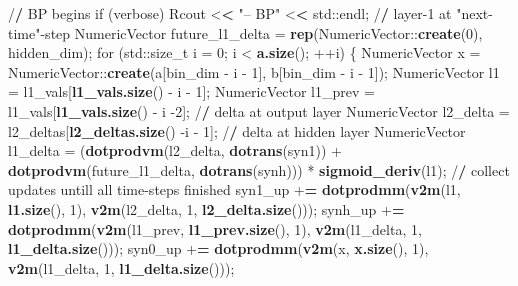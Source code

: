 \documentclass[]{article}
\newenvironment{Shaded}{\begin{snugshade}}{\end{snugshade}}
\newcommand{\KeywordTok}[1]{\textcolor[rgb]{0.13,0.29,0.53}{\textbf{{#1}}}}
\newcommand{\DataTypeTok}[1]{\textcolor[rgb]{0.13,0.29,0.53}{{#1}}}
\newcommand{\DecValTok}[1]{\textcolor[rgb]{0.00,0.00,0.81}{{#1}}}
\newcommand{\StringTok}[1]{\textcolor[rgb]{0.31,0.60,0.02}{{#1}}}
\newcommand{\ErrorTok}[1]{\textcolor[rgb]{0.64,0.00,0.00}{\textbf{{#1}}}}
\newcommand{\NormalTok}[1]{{#1}}
\begin{document}
\begin{Shaded}
\begin{Highlighting}[]
{{    \NormalTok{/}\ErrorTok{/}\StringTok{ }\NormalTok{BP begins}
    \NormalTok{if (verbose) Rcout <}\ErrorTok{<}\StringTok{ "-- BP"} \NormalTok{<}\ErrorTok{<}\StringTok{ }\NormalTok{std::endl;}
    \NormalTok{/}\ErrorTok{/}\StringTok{ }\NormalTok{layer}\DecValTok{-1} \NormalTok{at }\StringTok{"next-time"}\NormalTok{-step}
    \NormalTok{NumericVector future_l1_delta =}\StringTok{ }\KeywordTok{rep}\NormalTok{(NumericVector::}\KeywordTok{create}\NormalTok{(}\DecValTok{0}\NormalTok{), hidden_dim);}
    \NormalTok{for (std::size_t }\DataTypeTok{i =} \DecValTok{0}\NormalTok{; i <}\StringTok{ }\KeywordTok{a.size}\NormalTok{(); ++i) \{}
      \NormalTok{NumericVector x =}\StringTok{ }\NormalTok{NumericVector::}\KeywordTok{create}\NormalTok{(a[bin_dim -}\StringTok{ }\NormalTok{i -}\StringTok{ }\DecValTok{1}\NormalTok{],}
                                              \NormalTok{b[bin_dim -}\StringTok{ }\NormalTok{i -}\StringTok{ }\DecValTok{1}\NormalTok{]);}
      \NormalTok{NumericVector l1 =}\StringTok{ }\NormalTok{l1_vals[}\KeywordTok{l1_vals.size}\NormalTok{() -}\StringTok{ }\NormalTok{i -}\StringTok{ }\DecValTok{1}\NormalTok{];}
      \NormalTok{NumericVector l1_prev =}\StringTok{ }\NormalTok{l1_vals[}\KeywordTok{l1_vals.size}\NormalTok{() -}\StringTok{ }\NormalTok{i -}\DecValTok{2}\NormalTok{];}
      \NormalTok{/}\ErrorTok{/}\StringTok{ }\NormalTok{delta at output layer}
      \NormalTok{NumericVector l2_delta =}\StringTok{ }\NormalTok{l2_deltas[}\KeywordTok{l2_deltas.size}\NormalTok{() -i -}\StringTok{ }\DecValTok{1}\NormalTok{];}
      \NormalTok{/}\ErrorTok{/}\StringTok{ }\NormalTok{delta at hidden layer}
      \NormalTok{NumericVector l1_delta =}\StringTok{ }\NormalTok{(}\KeywordTok{dotprodvm}\NormalTok{(l2_delta, }\KeywordTok{dotrans}\NormalTok{(syn1)) +}
\StringTok{                               }\KeywordTok{dotprodvm}\NormalTok{(future_l1_delta, }\KeywordTok{dotrans}\NormalTok{(synh))) *}
\StringTok{                               }\KeywordTok{sigmoid_deriv}\NormalTok{(l1);}
      \NormalTok{/}\ErrorTok{/}\StringTok{ }\NormalTok{collect updates untill all time-steps finished}
      \NormalTok{syn1_up +}\ErrorTok{=}\StringTok{ }\KeywordTok{dotprodmm}\NormalTok{(}\KeywordTok{v2m}\NormalTok{(l1, }\KeywordTok{l1.size}\NormalTok{(), }\DecValTok{1}\NormalTok{),}
                           \KeywordTok{v2m}\NormalTok{(l2_delta, }\DecValTok{1}\NormalTok{, }\KeywordTok{l2_delta.size}\NormalTok{()));}
      \NormalTok{synh_up +}\ErrorTok{=}\StringTok{ }\KeywordTok{dotprodmm}\NormalTok{(}\KeywordTok{v2m}\NormalTok{(l1_prev, }\KeywordTok{l1_prev.size}\NormalTok{(), }\DecValTok{1}\NormalTok{),}
                           \KeywordTok{v2m}\NormalTok{(l1_delta, }\DecValTok{1}\NormalTok{, }\KeywordTok{l1_delta.size}\NormalTok{()));}
      \NormalTok{syn0_up +}\ErrorTok{=}\StringTok{ }\KeywordTok{dotprodmm}\NormalTok{(}\KeywordTok{v2m}\NormalTok{(x, }\KeywordTok{x.size}\NormalTok{(), }\DecValTok{1}\NormalTok{),}
                           \KeywordTok{v2m}\NormalTok{(l1_delta, }\DecValTok{1}\NormalTok{, }\KeywordTok{l1_delta.size}\NormalTok{()));}

}}
\end{Highlighting}
\end{Shaded}
\end{document}
